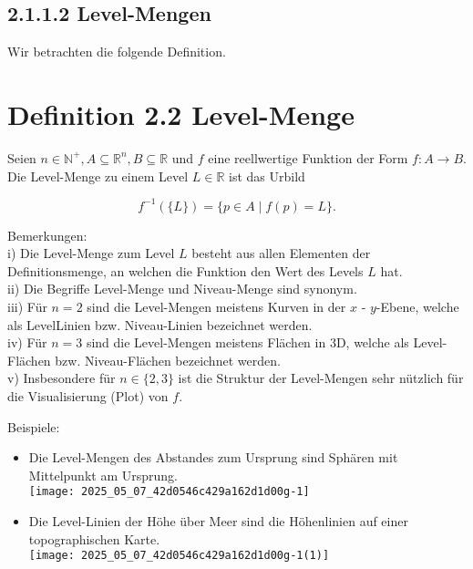 \documentclass[10pt]{article}
\begin{document}
\subsection*{2.1.1.2 Level-Mengen}
Wir betrachten die folgende Definition.

\section*{Definition 2.2 Level-Menge}
Seien $n \in \mathbb{N}^{+}, A \subseteq \mathbb{R}^{n}, B \subseteq \mathbb{R}$ und $f$ eine reellwertige Funktion der Form $f: A \rightarrow B$. Die Level-Menge zu einem Level $L \in \mathbb{R}$ ist das Urbild


\begin{equation*}
f^{-1}(\{L\})=\{p \in A \mid f(p)=L\} . \tag{2.17}
\end{equation*}


Bemerkungen:\\
i) Die Level-Menge zum Level $L$ besteht aus allen Elementen der Definitionsmenge, an welchen die Funktion den Wert des Levels $L$ hat.\\
ii) Die Begriffe Level-Menge und Niveau-Menge sind synonym.\\
iii) Für $n=2$ sind die Level-Mengen meistens Kurven in der $x$ - $y$-Ebene, welche als LevelLinien bzw. Niveau-Linien bezeichnet werden.\\
iv) Für $n=3$ sind die Level-Mengen meistens Flächen in 3D, welche als Level-Flächen bzw. Niveau-Flächen bezeichnet werden.\\
v) Insbesondere für $n \in\{2,3\}$ ist die Struktur der Level-Mengen sehr nützlich für die Visualisierung (Plot) von $f$.

Beispiele:

\begin{itemize}
  \item Die Level-Mengen des Abstandes zum Ursprung sind Sphären mit Mittelpunkt am Ursprung.\\
\texttt{[image: 2025\_05\_07\_42d0546c429a162d1d00g-1]}
  \item Die Level-Linien der Höhe über Meer sind die Höhenlinien auf einer topographischen Karte.\\
\texttt{[image: 2025\_05\_07\_42d0546c429a162d1d00g-1(1)]}
\end{itemize}
\end{document}
